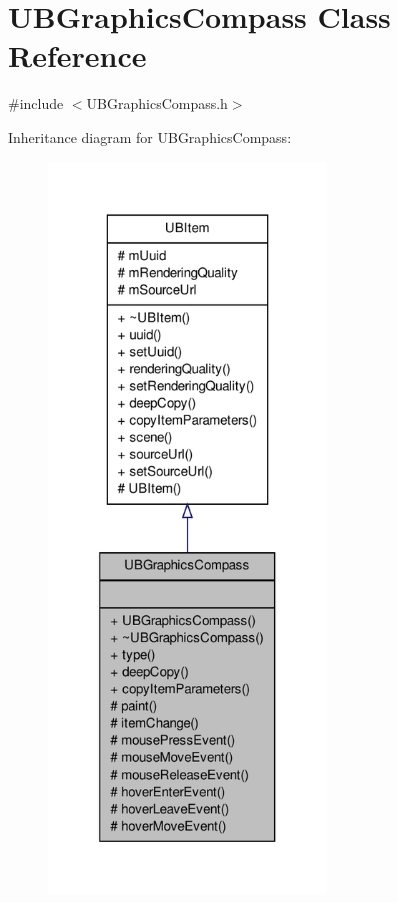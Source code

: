 \hypertarget{class_u_b_graphics_compass}{\section{U\-B\-Graphics\-Compass Class Reference}
\label{d6/d56/class_u_b_graphics_compass}
}


{\ttfamily \#include $<$U\-B\-Graphics\-Compass.\-h$>$}



Inheritance diagram for U\-B\-Graphics\-Compass\-:
\nopagebreak
\begin{figure}[H]
\begin{center}
\leavevmode
\includegraphics[height=550pt]{d2/df1/class_u_b_graphics_compass__inherit__graph}
\end{center}
\end{figure}


